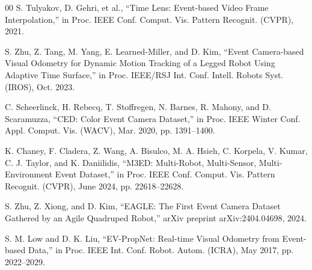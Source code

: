 \documentclass[conference]{IEEEtran}
\begin{document}
\begin{thebibliography}{00}
 S. Tulyakov, D. Gehri, et al., ``Time Lens: Event-based Video Frame Interpolation,'' in Proc. IEEE Conf. Comput. Vis. Pattern Recognit. (CVPR), 2021.

 S. Zhu, Z. Tang, M. Yang, E. Learned-Miller, and D. Kim, ``Event Camera-based Visual Odometry for Dynamic Motion Tracking of a Legged Robot Using Adaptive Time Surface,'' in Proc. IEEE/RSJ Int. Conf. Intell. Robots Syst. (IROS), Oct. 2023.

 C. Scheerlinck, H. Rebecq, T. Stoffregen, N. Barnes, R. Mahony, and D. Scaramuzza, ``CED: Color Event Camera Dataset,'' in Proc. IEEE Winter Conf. Appl. Comput. Vis. (WACV), Mar. 2020, pp. 1391--1400.

 K. Chaney, F. Cladera, Z. Wang, A. Bisulco, M. A. Hsieh, C. Korpela, V. Kumar, C. J. Taylor, and K. Daniilidis, ``M3ED: Multi-Robot, Multi-Sensor, Multi-Environment Event Dataset,'' in Proc. IEEE Conf. Comput. Vis. Pattern Recognit. (CVPR), June 2024, pp. 22618--22628.

 S. Zhu, Z. Xiong, and D. Kim, ``EAGLE: The First Event Camera Dataset Gathered by an Agile Quadruped Robot,'' arXiv preprint arXiv:2404.04698, 2024.

 S. M. Low and D. K. Liu, ``EV-PropNet: Real-time Visual Odometry from Event-based Data,'' in Proc. IEEE Int. Conf. Robot. Autom. (ICRA), May 2017, pp. 2022--2029.

\end{thebibliography}
\end{document}
